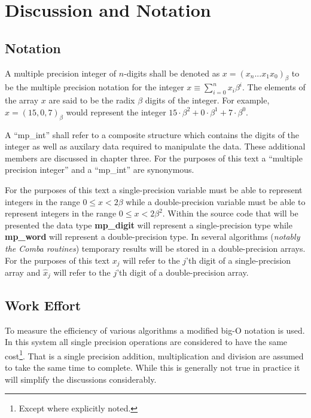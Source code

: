 \documentclass[b5paper]{book}
\begin{document}
\section{Discussion and Notation}
\subsection{Notation}
A multiple precision integer of $n$-digits shall be denoted as $x = (x_n ... x_1 x_0)_{ \beta }$ to be the 
multiple precision notation for the integer $x \equiv \sum_{i=0}^{n} x_i\beta^i$.  The elements of the array $x$ are
said to be the radix $\beta$ digits of the integer.  For example, $x = (15,0,7)_{\beta}$ would represent the 
integer $15\cdot\beta^2 + 0\cdot\beta^1 + 7\cdot\beta^0$.  

A ``mp\_int'' shall refer to a composite structure which contains the digits of the integer as well as auxilary data
required to manipulate the data.  These additional members are discussed in chapter three.  For the purposes of this text
a ``multiple precision integer'' and a ``mp\_int'' are synonymous.

   
For the purposes of this text a single-precision variable must be able to represent integers in the range $0 \le x < 2 \beta$ while
a double-precision variable must be able to represent integers in the range $0 \le x < 2 \beta^2$.  Within the source code that will be
presented the data type \textbf{mp\_digit} will represent a single-precision type while \textbf{mp\_word} will represent a 
double-precision type.  In several algorithms (\textit{notably the Comba routines}) temporary results 
will be stored in a double-precision arrays.  For the purposes of this text $x_j$ will refer to the 
$j$'th digit of a single-precision array and $\hat x_j$ will refer to the $j$'th digit of a double-precision
array.

\subsection{Work Effort}
To measure the efficiency of various algorithms a modified big-O notation is used.  In this system all 
single precision operations are considered to have the same cost\footnote{Except where explicitly noted.}.  
That is a single precision addition, multiplication and division are assumed to take the same time to 
complete.  While this is generally not true in practice it will simplify the discussions considerably.
\end{document}
